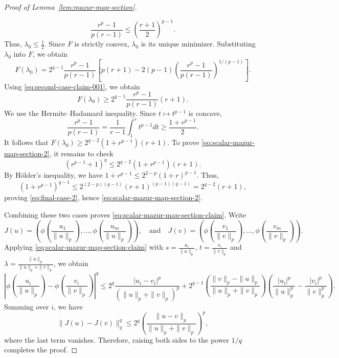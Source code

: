 \documentclass[11pt,a4paper]{amsart}
\theoremstyle{plain}
\theoremstyle{definition}
\begin{document}
\begin{proof}[Proof of Lemma~\ref{lem:mazur-map-section}]
\begin{enumerate}[wide =0pt, labelwidth= 1.1cm]
\begin{equation} \label{eq:second-case-claim-001}
\frac{r^p-1}{p(r-1)} \leq \left(\frac{r+1}{2}\right)^{p-1}.
\end{equation}
Thus, $\lambda_0 \leq \frac{1}{2}$. Since $F$ is strictly convex, $\lambda_0$ is its unique minimizer. Substituting $\lambda_0$ into $F$, we obtain
\[
    F(\lambda_0 ) = 2^{q-1} \frac{r^p-1}{p(r-1)}\left[p(r+1)-2(p-1)\left(\frac{r^p-1}{p(r-1)}\right)^{1 /(p-1)}\right].
\]
Using \eqref{eq:second-case-claim-001}, we obtain
$$
F\left(\lambda_0\right) \geq 2^{q-1} \frac{r^p-1}{p(r-1)}(r+1) .
$$
We use the Hermite--Hadamard inequality. Since $t \mapsto t^{p-1}$ is concave,
$$
\frac{r^p-1}{p(r-1)}=\frac{1}{r-1} \int_1^r t^{p-1} d t \geq \frac{1+r^{p-1}}{2}.
$$
It follows that
$
F\left(\lambda_0\right) \geq 2^{q-2}\left(1+r^{p-1}\right)(r+1) .
$
To prove \eqref{eq:scalar-mazur-map-section-2}, it remains to check
\begin{equation} \label{eq:final-case-2}
\left(r^{p-1}+1\right)^q \leq 2^{q-2}\left(1+r^{p-1}\right)(r+1).
\end{equation}
By H\"older's inequality, we have
$
1+r^{p-1} \leq 2^{2-p}(1+r)^{p-1} .
$
Thus,
$$
    \left(1+r^{p-1}\right)^{q-1}  \leq 2^{(2-p)(q-1)}(r+1)^{(p-1)(q-1)}  =2^{q-2}(r+1) ,
    $$
    proving \eqref{eq:final-case-2}, hence \eqref{eq:scalar-mazur-map-section-2}.
\end{enumerate}

    Combining these two cases proves \eqref{eq:scalar-mazur-map-section-claim}. 
    Write
    \[
    J(u)=\left(\phi\left(\frac{u_1}{\|u\|_p}\right), \ldots, \phi\left(\frac{u_m}{\|u\|_p}\right)\right),
    \quad \text{and}\quad
    J(v)=\left(\phi\left(\frac{v_1}{\|v\|_p}\right), \ldots, \phi\left(\frac{v_m}{\|v\|_p}\right)\right).
\]
Applying \eqref{eq:scalar-mazur-map-section-claim} with
$s=\frac{u_i}{\|u\|_p}$, $t=\frac{v_i}{\|v\|_p}$ and $\lambda = \frac{\|u\|_p}{\|u\|_p + \|v\|_p}$, we obtain
\[
\left|\phi\left(\frac{u_i}{\|u\|_p}\right)-\phi\left(\frac{v_i}{\|v\|_p}\right)\right|^q
    \leq
    2^q\frac{|u_i -v_i|^p}{(\|u\|_p + \|v\|_p)^p}
    +
    2^{q-1}\left(\frac{\|v\|_p - \|u\|_p}{\|u\|_p + \|v\|_p}\right)
    \left(\frac{\left|u_i\right|^p}{\|u\|_p^p}-\frac{\left|v_i\right|^p}{\|v\|_p^p}\right).
\]
Summing over $i$, we have
\[
    \|J(u)-J(v)\|_q^q
    \leq
    2^q
    \left(
        \frac{\|u-v\|_p}
        {\|u\|_p+\|v\|_p}
    \right)^p,
\]
where the last term vanishes. Therefore, raising both sides to the power $1 / q$ completes the proof.
\end{proof}
\end{document}
